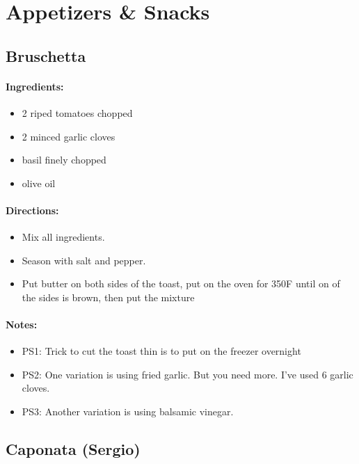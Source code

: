 \documentclass{article}
\begin{document}
\section{Appetizers \& Snacks}


\subsection{Bruschetta}

\paragraph{Ingredients:}
\begin{itemize}
    \item 2 riped tomatoes chopped
    \item 2 minced garlic cloves
    \item basil finely chopped
    \item olive oil
\end{itemize}

\paragraph{Directions:}
\begin{itemize}
    \item Mix all ingredients.
    \item Season with salt and pepper.
    \item Put butter on both sides of the toast, put on the oven for 350F until on of the sides is brown, then put the mixture
\end{itemize}

\paragraph{Notes:}
\begin{itemize}
    \item PS1: Trick to cut the toast thin is to put on the freezer overnight
    \item PS2: One variation is using fried garlic. But you need more. I've used 6 garlic cloves.
    \item PS3: Another variation is using balsamic vinegar.
\end{itemize}

\subsection{Caponata (Sergio)}
\end{document}
